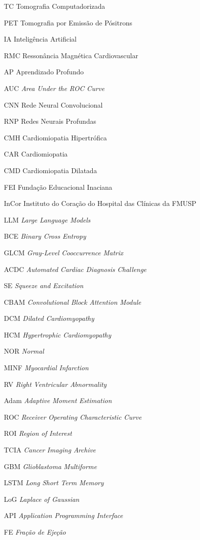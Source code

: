 \begin{siglas}
    \item[TC] Tomografia Computadorizada
    \item[PET] Tomografia por Emissão de Pósitrons
    \item[IA] Inteligência Artificial
    \item[RMC] Ressonância Magnética Cardiovascular
    \item[AP] Aprendizado Profundo
    \item[AUC] \textit{Area Under the ROC Curve}
    \item[CNN] Rede Neural Convolucional
    \item[RNP] Redes Neurais Profundas
    \item[CMH] Cardiomiopatia Hipertrófica
    \item[CAR] Cardiomiopatia
    \item[CMD] Cardiomiopatia Dilatada
    \item[FEI] Fundação Educacional Inaciana
    \item[InCor] Instituto do Coração do Hospital das Clínicas da FMUSP
    \item[LLM] \textit{Large Language Models}
    \item[BCE] \textit{Binary Cross Entropy}
    \item[GLCM] \textit{Gray-Level Cooccurrence Matrix}
    \item[ACDC] \textit{Automated Cardiac Diagnosis Challenge}
    \item[SE] \textit{Squeeze and Excitation}
    \item[CBAM] \textit{Convolutional Block Attention Module}
    \item[DCM] \textit{Dilated Cardiomyopathy}
    \item[HCM] \textit{Hypertrophic Cardiomyopathy}
    \item[NOR] \textit{Normal}
    \item[MINF] \textit{Myocardial Infarction}
    \item[RV] \textit{Right Ventricular Abnormality}
    \item[Adam] \textit{Adaptive Moment Estimation}
    \item[ROC] \textit{Receiver Operating Characteristic Curve}
    \item[ROI] \textit{Region of Interest}
    \item[TCIA] \textit{Cancer Imaging Archive}
    \item[GBM] \textit{Glioblastoma Multiforme}
    \item[LSTM] \textit{Long Short Term Memory}
    \item[LoG] \textit{Laplace of Gaussian}
    \item[API] \textit{Application Programming Interface}
    \item[FE] \textit{Fração de Ejeção}
\end{siglas}


